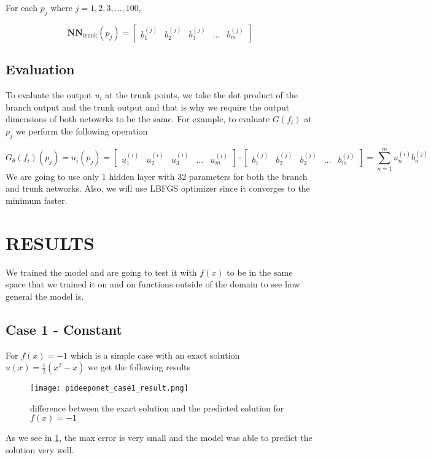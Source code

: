 \documentclass[a4paper, onecolumn, 12pt]{article}
\begin{document}
For each $p_j$ where $j=1, 2, 3, \dots, 100$,

$$
\mathbf{NN}_{\text{trunk}}(p_j) = \begin{bmatrix}
b^{(j)}_1 & b^{(j)}_2 & b^{(j)}_3 & \dots & b^{(j)}_m
\end{bmatrix}
$$

\subsection*{Evaluation}
To evaluate the output $u_i$ at the trunk points,
we take the dot product of the branch output and the trunk output and that is why we require the
output dimensions of both netowrks to be the same. For example,
to evaluate $G(f_i)$ at $p_j$ we perform the following operation

$$
G_{\theta}(f_i)(p_j) = u_i(p_j) = \begin{bmatrix}
u^{(i)}_1 & u^{(i)}_2 & u^{(i)}_3 & \dots & u^{(i)}_m
\end{bmatrix} \cdot \begin{bmatrix}
b^{(j)}_1 & b^{(j)}_2 & b^{(j)}_3 & \dots & b^{(j)}_m
\end{bmatrix}
= \sum_{n=1}^{m} u^{(i)}_n b^{(j)}_n
$$
We are going to use only 1 hidden layer with 32 parameters for both the branch and trunk networks. Also, we will use LBFGS optimizer since it converges to the minimum faster.
\section*{RESULTS}
We trained the model and are going to test it with $f(x)$ to be in the same space that we trained it on
and on functions outside of the domain to see how general the model is.

\subsection*{Case 1 - Constant}
For $f(x) = -1$ which is a simple case with an exact solution $u(x) = \frac{1}{2} (x^2 - x)$ we get the following results 
\begin{figure}[H]
    \centering 
    \texttt{[image: pideeponet\_case1\_result.png]}
    \label{constant_f}
    \caption[figure1]{difference between the exact solution and the predicted solution for $f(x) = -1$}
\end{figure}
As we see in \ref*{constant_f}, the max error is very small and the model 
was able to predict the solution very well.
\end{document}
